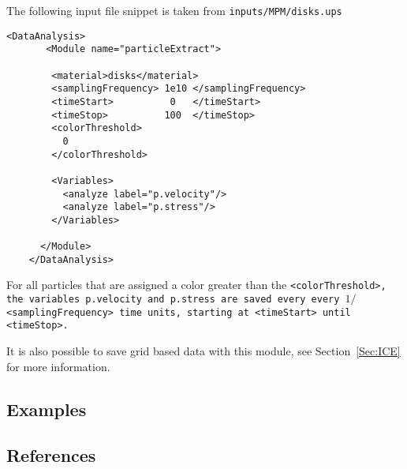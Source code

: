 The following input file snippet is taken from
\tt inputs/MPM/disks.ups \normalfont  
\begin{Verbatim}[fontsize=\footnotesize]
    <DataAnalysis>
       <Module name="particleExtract">

        <material>disks</material>
        <samplingFrequency> 1e10 </samplingFrequency>
        <timeStart>          0   </timeStart>
        <timeStop>          100  </timeStop>
        <colorThreshold>
          0
        </colorThreshold>

        <Variables>
          <analyze label="p.velocity"/>
          <analyze label="p.stress"/>
        </Variables>

      </Module>
    </DataAnalysis>
\end{Verbatim}

For all particles that are assigned a color greater than the
\tt <colorThreshold>, \normalfont the variables
\tt p.velocity \normalfont and
\tt p.stress \normalfont are saved every every
$1/$\tt <samplingFrequency> \normalfont time units, starting at
\tt <timeStart> \normalfont until
\tt <timeStop>. \normalfont

It is also possible to save grid based data with this module,
see Section~\ref{Sec:ICE} for more information.

\subsection{Examples} \label{Sec:ExamplesMPM}

\subsection{References}









